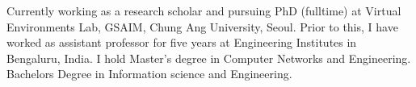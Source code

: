 

\begin{cvparagraph}

Currently working as a research scholar and pursuing PhD (fulltime) at Virtual Environments Lab, GSAIM, Chung Ang University, Seoul. Prior to this, I have worked as assistant professor for five years at Engineering Institutes in Bengaluru, India. I hold Master's degree in Computer Networks and Engineering. Bachelors Degree in Information science and Engineering.  
\end{cvparagraph}
